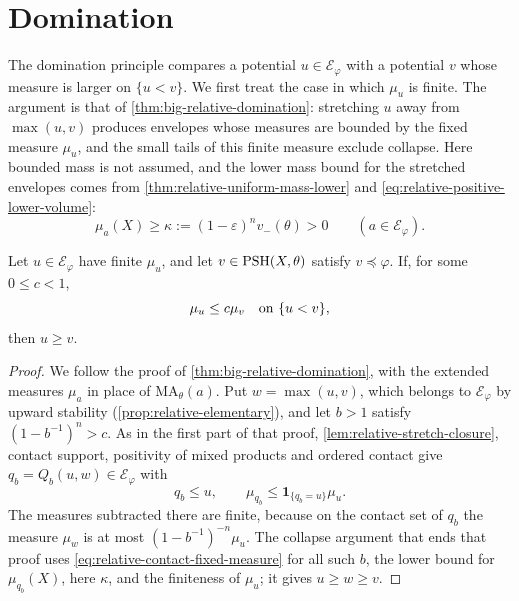 \section{Domination}
\label{sec:relative-finite-domination}

The domination principle compares a potential $u\in\mathcal E_\varphi$ with a potential $v$ whose measure is larger on $\{u<v\}$. We first treat the case in which $\mu_u$ is finite. The argument is that of \cref{thm:big-relative-domination}: stretching $u$ away from $\max(u,v)$ produces envelopes whose measures are bounded by the fixed measure $\mu_u$, and the small tails of this finite measure exclude collapse. Here bounded mass is not assumed, and the lower mass bound for the stretched envelopes comes from \cref{thm:relative-uniform-mass-lower} and \eqref{eq:relative-positive-lower-volume}:
\[
 \mu_a(X)\geq\kappa:=(1-\varepsilon)^n v_-(\theta)>0
 \qquad(a\in\mathcal E_\varphi).
\]

\begin{theorem}\label{thm:relative-finite-domination}
Let $u\in\mathcal E_\varphi$ have finite $\mu_u$, and let $v\in\mathrm{PSH}(X,\theta)$ satisfy $v\preceq\varphi$. If, for some $0\leq c<1$,
\[
 \mu_u\leq c\mu_v\quad\hbox{on }\{u<v\},
\]
then $u\geq v$.
\end{theorem}
\begin{proof}
We follow the proof of \cref{thm:big-relative-domination}, with the extended measures $\mu_a$ in place of $\mathrm{MA}_\theta(a)$. Put $w=\max(u,v)$, which belongs to $\mathcal E_\varphi$ by upward stability (\cref{prop:relative-elementary}), and let $b>1$ satisfy $(1-b^{-1})^n>c$. As in the first part of that proof, \cref{lem:relative-stretch-closure}, contact support, positivity of mixed products and ordered contact give $q_b=Q_b(u,w)\in\mathcal E_\varphi$ with
\begin{equation}\label{eq:relative-contact-fixed-measure}
 q_b\leq u,\qquad
 \mu_{q_b}\leq\mathbf1_{\{q_b=u\}}\mu_u.
\end{equation}
The measures subtracted there are finite, because on the contact set of $q_b$ the measure $\mu_w$ is at most $(1-b^{-1})^{-n}\mu_u$. The collapse argument that ends that proof uses \eqref{eq:relative-contact-fixed-measure} for all such $b$, the lower bound for $\mu_{q_b}(X)$, here $\kappa$, and the finiteness of $\mu_u$; it gives $u\geq w\geq v$.
\end{proof}

















\par\endgroup
